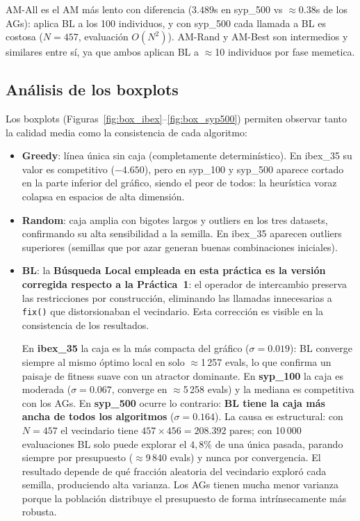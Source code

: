 \documentclass[12pt,a4paper]{article}
\begin{document}
AM-All es el AM más lento con diferencia ($3.489$s en syp\_500 vs $\approx$0.38s de los
AGs): aplica BL a los 100 individuos, y con syp\_500 cada llamada a BL es costosa
($N=457$, evaluación $O(N^2)$). AM-Rand y AM-Best son intermedios y similares entre sí,
ya que ambos aplican BL a $\approx$10 individuos por fase memetica.

\subsection{Análisis de los boxplots}

Los boxplots (Figuras~\ref{fig:box_ibex}--\ref{fig:box_syp500}) permiten observar
tanto la calidad media como la consistencia de cada algoritmo:

\begin{itemize}
  \item \textbf{Greedy}: línea única sin caja (completamente determinístico). En
  ibex\_35 su valor es competitivo ($-4.650$), pero en syp\_100 y syp\_500 aparece
  cortado en la parte inferior del gráfico, siendo el peor de todos: la heurística voraz
  colapsa en espacios de alta dimensión.

  \item \textbf{Random}: caja amplia con bigotes largos y outliers en los tres datasets,
  confirmando su alta sensibilidad a la semilla. En ibex\_35 aparecen outliers superiores
  (semillas que por azar generan buenas combinaciones iniciales).

  \item \textbf{BL}: la \textbf{Búsqueda Local empleada en esta práctica es la versión
  corregida respecto a la Práctica~1}: el operador de intercambio preserva las
  restricciones por construcción, eliminando las llamadas innecesarias a \texttt{fix()}
  que distorsionaban el vecindario. Esta corrección es visible en la consistencia de los
  resultados.

  En \textbf{ibex\_35} la caja es la más compacta del gráfico ($\sigma=0.019$): BL
  converge siempre al mismo óptimo local en solo $\approx$1\,257 evals, lo que confirma
  un paisaje de fitness suave con un atractor dominante. En \textbf{syp\_100} la caja es
  moderada ($\sigma=0.067$, converge en $\approx$5\,258 evals) y la mediana es
  competitiva con los AGs. En \textbf{syp\_500} ocurre lo contrario: \textbf{BL tiene
  la caja más ancha de todos los algoritmos} ($\sigma=0.164$). La causa es estructural:
  con $N=457$ el vecindario tiene $457\times456=208{.}392$ pares; con 10\,000
  evaluaciones BL solo puede explorar el $4{,}8\%$ de una única pasada, parando siempre
  por presupuesto ($\approx$9\,840 evals) y nunca por convergencia. El resultado depende
  de qué fracción aleatoria del vecindario exploró cada semilla, produciendo alta
  varianza. Los AGs tienen mucha menor varianza porque la población distribuye el
  presupuesto de forma intrínsecamente más robusta.


\end{itemize}
\end{document}
